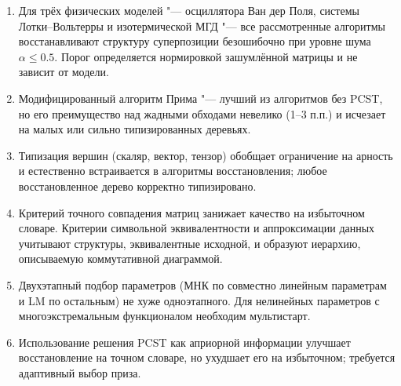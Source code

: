 \documentclass[12pt]{article}
\begin{document}
\begin{enumerate}
\item Для трёх физических моделей "--- осциллятора Ван дер Поля, системы Лотки--Вольтерры и изотермической МГД "--- все рассмотренные алгоритмы восстанавливают структуру суперпозиции безошибочно при уровне шума $\alpha\leqslant0.5$. Порог определяется нормировкой зашумлённой матрицы и не зависит от модели.
\item Модифицированный алгоритм Прима "--- лучший из алгоритмов без PCST, но его преимущество над жадными обходами невелико (1--3 п.п.) и исчезает на малых или сильно типизированных деревьях.
\item Типизация вершин (скаляр, вектор, тензор) обобщает ограничение на арность и естественно встраивается в алгоритмы восстановления; любое восстановленное дерево корректно типизировано.
\item Критерий точного совпадения матриц занижает качество на избыточном словаре. Критерии символьной эквивалентности и аппроксимации данных учитывают структуры, эквивалентные исходной, и образуют иерархию, описываемую коммутативной диаграммой.
\item Двухэтапный подбор параметров (МНК по совместно линейным параметрам и LM по остальным) не хуже одноэтапного. Для нелинейных параметров с многоэкстремальным функционалом необходим мультистарт.
\item Использование решения PCST как априорной информации улучшает восстановление на точном словаре, но ухудшает его на избыточном; требуется адаптивный выбор приза.
\end{enumerate}
\end{document}
